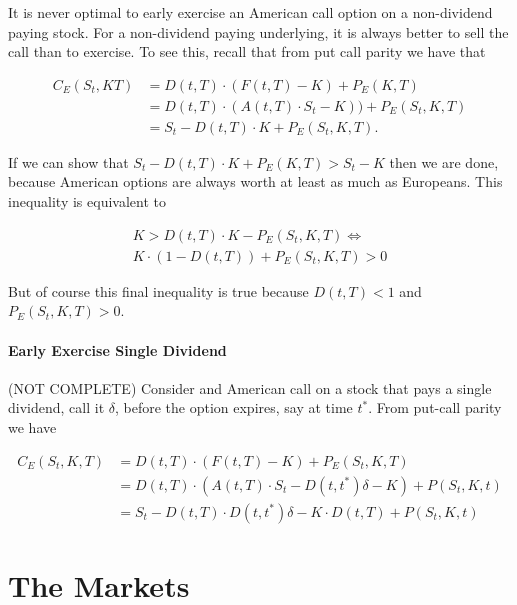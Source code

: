 \documentclass[11pt,]{krantz}
\begin{document}
It is never optimal to early exercise an American call option on a non-dividend paying stock. For a non-dividend paying underlying, it is always better to sell the call than to exercise. To see this, recall that from put call parity we have that

\begin{align*}
C_E(S_t, K T) &= D(t, T) \cdot (F(t, T) - K) + P_E(K, T) \\
            &= D(t, T) \cdot (A(t, T) \cdot S_t - K)) + P_E(S_t, K, T) \\
            &= S_t - D(t, T) \cdot K + P_E(S_t, K, T).
\end{align*}

If we can show that \(S_t - D(t, T) \cdot K + P_E(K, T) > S_t - K\) then we are done, because American options are always worth at least as much as Europeans. This inequality is equivalent to

\begin{align*}
K > D(t, T) \cdot K - P_E(S_t, K, T) \iff \\
K\cdot(1 - D(t, T)) + P_E(S_t, K, T) > 0
\end{align*}

But of course this final inequality is true because \(D(t, T) < 1\) and \(P_E(S_t, K, T) > 0\).

\subsubsection*{Early Exercise Single Dividend}\label{early-exercise-single-dividend}

(NOT COMPLETE) Consider and American call on a stock that pays a single dividend, call it \(\delta\), before the option expires, say at time \(t^*\). From put-call parity we have

\begin{align*}
C_E(S_t, K, T)  &= D(t, T) \cdot (F(t, T) - K) + P_E(S_t, K, T) \\
                &= D(t, T) \cdot (A(t, T) \cdot S_t - D(t, t^*)\delta - K) + P(S_t, K, t) \\
                &= S_t - D(t, T) \cdot D(t, t^*) \delta - K \cdot D(t, T) + P(S_t, K, t)
\end{align*}

\chapter{The Markets}\label{the-markets}
\end{document}
